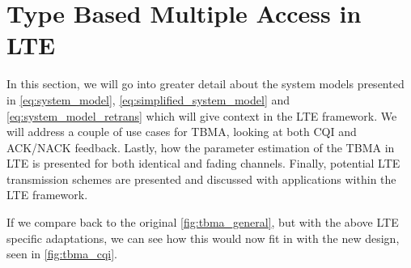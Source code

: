 \documentclass{article}
\begin{document}


\section{Type Based Multiple Access in LTE}\label{tbma_sec}

In this section, we will go into greater detail about the system models presented in \cref{eq:system_model}, \cref{eq:simplified_system_model} and \cref{eq:system_model_retrans} which will give context in the LTE framework. We will address a couple of use cases for \ac{TBMA}, looking at both CQI and ACK/NACK feedback.
Lastly, how the parameter estimation of the TBMA in LTE is presented for both identical and fading channels. Finally, potential LTE transmission schemes are presented and discussed with applications within the LTE framework. 


If we compare back to the original \cref{fig:tbma_general}, but with the above LTE specific adaptations, we can see how this would now fit in with the new design, seen in \cref{fig:tbma_cqi}.
\end{document}

